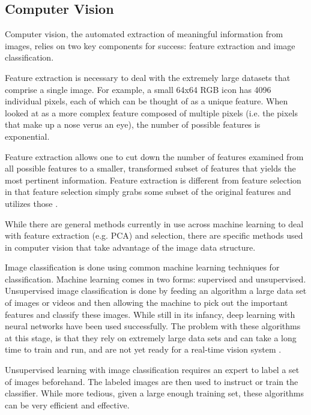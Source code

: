 \documentclass[letterpaper, 10 pt, conference]{ieeeconf}  %
\begin{document}
\subsection{Computer Vision}

Computer vision, the automated extraction of meaningful information from images, relies on two key components for success: feature extraction and image classification. 

Feature extraction is necessary to deal with the extremely large datasets that comprise a single image.  For example, a small 64x64 RGB icon has 4096 individual pixels, each of which can be thought of as a unique feature. When looked at as a more complex feature composed of multiple pixels (i.e. the pixels that make up a nose verus an eye), the number of possible features is exponential. 


Feature extraction allows one to cut down the number of features examined from all possible features to a smaller, transformed subset of features that yields the most pertinent information. Feature extraction is different from feature selection in that feature selection simply grabs some subset of the original features and utilizes those \cite{featSelExt}.

While there are general methods currently in use across machine learning to deal with feature extraction (e.g. PCA) and selection, there are specific methods used in computer vision that take advantage of the image data structure.

Image classification is done using common machine learning techniques for classification. Machine learning comes in two forms: supervised and unsupervised. Unsupervised image classification is done by feeding an algorithm a large data set of images or videos and then allowing the machine to pick out the important features and classify these images. While still in its infancy, deep learning with neural networks have been used successfully. The problem with these algorithms at this stage, is that they rely on extremely large data sets and can take a long time to train and run, and are not yet ready for a real-time vision system \cite{deepLearning1}. 

Unsupervised learning with image classification requires an expert to label a set of images beforehand. The labeled images are then used to instruct or train the classifier. While more tedious, given a large enough training set, these algorithms can be very efficient and effective.
\end{document}
